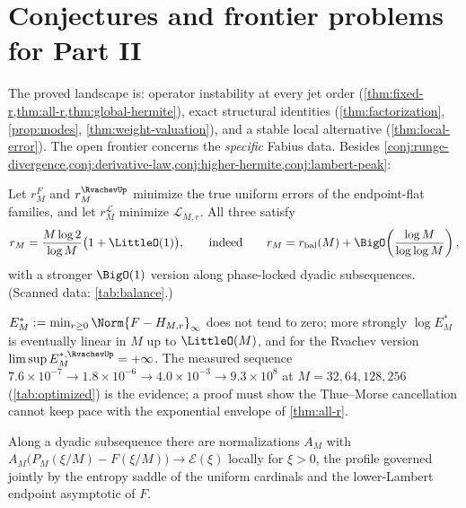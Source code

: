 \documentclass[11pt,oneside]{article}
\numberwithin{equation}{section}
\theoremstyle{definition}
\theoremstyle{remark}
\newcommand{\Leb}{\mathscr L}
\begin{document}
\section{Conjectures and frontier problems for Part II}
\label{sec:conjectures-interp}

The proved landscape is: operator instability at every jet order
(\cref{thm:fixed-r,thm:all-r,thm:global-hermite}), exact structural
identities (\cref{thm:factorization}, \cref{prop:modes},
\cref{thm:weight-valuation}), and a stable local alternative
(\cref{thm:local-error}).  The open frontier concerns the
\emph{specific} Fabius data.  Besides
\cref{conj:runge-divergence,conj:derivative-law,conj:higher-hermite,conj:lambert-peak}:

\begin{conjecture}
\label{conj:optimal-r}
Let $r^{F}_M$ and $r^{\RvachevUp}_M$ minimize the true uniform errors of the
endpoint-flat families, and let $r^{\Leb}_M$ minimize
$\Leb_{M,r}$.  All three satisfy
\begin{equation}
 r_M=\frac{M\log2}{\log M}\bigl(1+\LittleO(1)\bigr),
 \qquad\text{indeed}\qquad
 r_M=r_{\mathrm{bal}}(M)+\BigO\!\left(\frac{\log M}{\log\log M}\right),
 \label{eq:optimal-r-conj}
\end{equation}
with a stronger $\BigO(1)$ version along phase-locked dyadic
subsequences.  (Scanned data: \cref{tab:balance}.)
\end{conjecture}

\begin{conjecture}
\label{conj:optimized-divergence}
$E^{*}_M:=\min_{r\ge0}\Norm{F-H_{M,r}}_\infty$ does not tend to zero;
more strongly $\log E^{*}_M$ is eventually linear in $M$ up to
$\LittleO(M)$, and for the Rvachev version
$\limsup E^{*,\RvachevUp}_M=+\infty$.  The measured sequence
$7.6\times10^{-7}\to1.8\times10^{-6}\to4.0\times10^{-3}
\to9.3\times10^{8}$ at $M=32,64,128,256$
(\cref{tab:optimized}) is the evidence; a proof must show the
Thue--Morse cancellation cannot keep pace with the exponential
envelope of \cref{thm:all-r}.
\end{conjecture}

\begin{conjecture}
\label{conj:boundary-profile}
Along a dyadic subsequence there are normalizations $A_M$ with
$A_M\bigl(P_M(\xi/M)-F(\xi/M)\bigr)\to\mathcal E(\xi)$ locally for
$\xi>0$, the profile governed jointly by the entropy saddle of the
uniform cardinals and the lower-Lambert endpoint asymptotic of $F$.
\end{conjecture}
\end{document}
